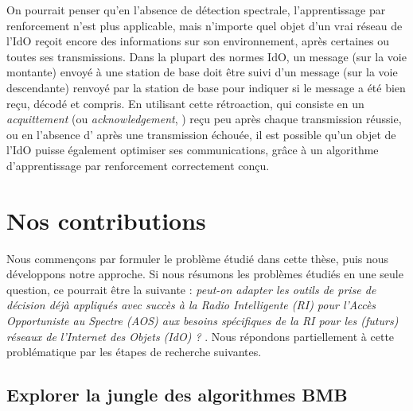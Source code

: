 \begin{resume_fr}
On pourrait penser qu'en l'absence de détection spectrale, l'apprentissage par renforcement n'est plus applicable, mais n'importe quel objet d'un vrai réseau de l'IdO reçoit encore des informations sur son environnement, après certaines ou toutes ses transmissions.
Dans la plupart des normes IdO, un message (sur la voie montante) envoyé à une station de base doit être suivi d'un message (sur la voie descendante) renvoyé par la station de base pour indiquer si le message a été bien reçu, décodé et compris.
%
En utilisant cette rétroaction, qui consiste en un \emph{acquittement} (ou \emph{acknowledgement}, \Ack) reçu peu après chaque transmission réussie, ou en l'absence d'\Ack{} après une transmission échouée, il est possible qu'un objet de l'IdO puisse également optimiser ses communications, grâce à un algorithme d'apprentissage par renforcement correctement conçu.



\section*{Nos contributions}

Nous commençons par formuler le problème étudié dans cette thèse, puis nous développons notre approche.
%
Si nous résumons les problèmes étudiés en une seule question, ce pourrait être la suivante :
\guillemotleft{} \emph{peut-on adapter les outils de prise de décision déjà appliqués avec succès à la Radio Intelligente (RI) pour l'Accès Opportuniste au Spectre (AOS) aux besoins spécifiques de la RI pour les (futurs) réseaux de l'Internet des Objets (IdO) ?} \guillemotright.
%
Nous répondons partiellement à cette problématique par les étapes de recherche suivantes.



\subsection*{Explorer la jungle des algorithmes BMB}


\end{resume_fr}
